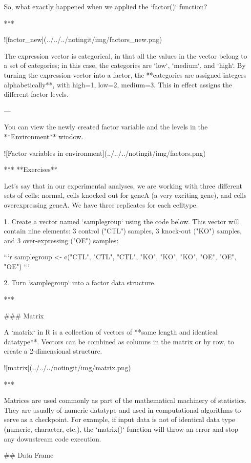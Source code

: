 So, what exactly happened when we applied the `factor()` function? 

***

![factor_new](../../../notingit/img/factors_new.png)

The expression vector is categorical, in that all the values in the vector belong to a set of categories; in this case, the categories are `low`, `medium`, and `high`. By turning the expression vector into a factor, the **categories are assigned integers alphabetically**, with high=1, low=2, medium=3. This in effect assigns the different factor levels. 

---

You can view the newly created factor variable and the levels in the **Environment** window.

![Factor variables in environment](../../../notingit/img/factors.png)


***
**Exercises**

Let's say that in our experimental analyses, we are working with three different sets of cells: normal, cells knocked out for geneA (a very exciting gene), and cells overexpressing geneA. We have three replicates for each celltype.

1. Create a vector named `samplegroup` using the code below. This vector will contain nine elements: 3 control ("CTL") samples, 3 knock-out ("KO") samples, and 3 over-expressing ("OE") samples:

	```r
	samplegroup <- c("CTL", "CTL", "CTL", "KO", "KO", "KO", "OE", "OE", "OE")
	```

2. Turn `samplegroup` into a factor data structure.

***

### Matrix

A `matrix` in R is a collection of vectors of **same length and identical datatype**. Vectors can be combined as columns in the matrix or by row, to create a 2-dimensional structure.

![matrix](../../../notingit/img/matrix.png)

***

Matrices are used commonly as part of the mathematical machinery of statistics. They are usually of numeric datatype and used in computational algorithms to serve as a checkpoint. For example, if input data is not of identical data type (numeric, character, etc.), the `matrix()` function will throw an error and stop any downstream code execution.


## Data Frame

